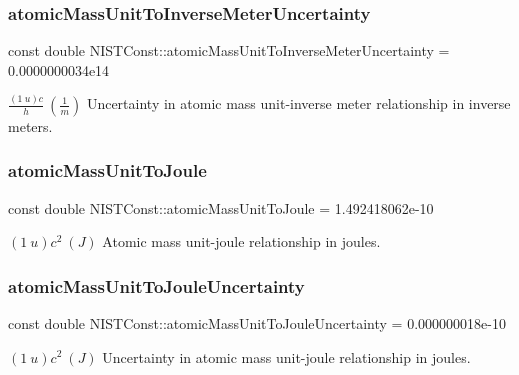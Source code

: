 \subsubsection{\texorpdfstring{atomic\+Mass\+Unit\+To\+Inverse\+Meter\+Uncertainty}{atomicMassUnitToInverseMeterUncertainty}}
{\footnotesize\ttfamily const double N\+I\+S\+T\+Const\+::atomic\+Mass\+Unit\+To\+Inverse\+Meter\+Uncertainty = 0.\+0000000034e14}

$\frac{(1\ u)c}{h} \ (\frac{1}{m})$ Uncertainty in atomic mass unit-\/inverse meter relationship in inverse meters. \mbox{\label{group___atomic_mass_unit_gaea7c1916a35df8824ac6a67be3f65f33}} 
\subsubsection{\texorpdfstring{atomic\+Mass\+Unit\+To\+Joule}{atomicMassUnitToJoule}}
{\footnotesize\ttfamily const double N\+I\+S\+T\+Const\+::atomic\+Mass\+Unit\+To\+Joule = 1.\+492418062e-\/10}

$(1\ u)c^2 \ (J)$ Atomic mass unit-\/joule relationship in joules. \mbox{\label{group___atomic_mass_unit_ga0d86dc8fac39e6589510009376d261d6}} 
\subsubsection{\texorpdfstring{atomic\+Mass\+Unit\+To\+Joule\+Uncertainty}{atomicMassUnitToJouleUncertainty}}
{\footnotesize\ttfamily const double N\+I\+S\+T\+Const\+::atomic\+Mass\+Unit\+To\+Joule\+Uncertainty = 0.\+000000018e-\/10}

$(1\ u)c^2 \ (J)$ Uncertainty in atomic mass unit-\/joule relationship in joules. \mbox{\label{group___atomic_mass_unit_gaf9c3a2dfd69d4e74cee3361abd7d7ecf}} 
